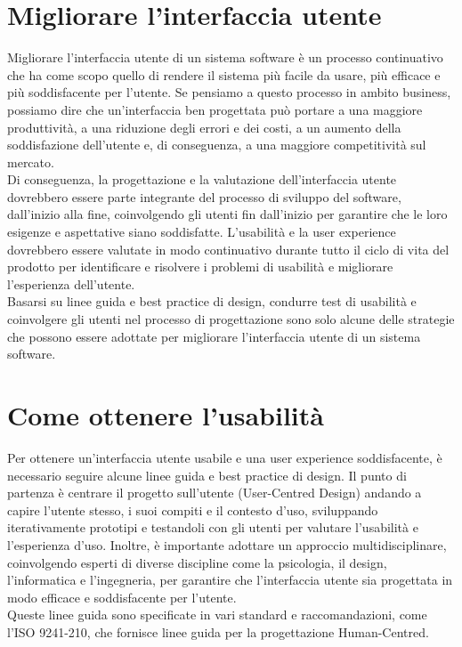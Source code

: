 \documentclass{report}
\begin{document}
	\section{Migliorare l'interfaccia utente}
	Migliorare l'interfaccia utente di un sistema software è un processo continuativo che ha come scopo quello di rendere il sistema più facile da usare, più efficace e più soddisfacente per l'utente. Se pensiamo a questo processo in ambito business, possiamo dire che un'interfaccia ben progettata può portare a una maggiore produttività, a una riduzione degli errori e dei costi, a un aumento della soddisfazione dell'utente e, di conseguenza, a una maggiore competitività sul mercato.
	\vspace{\baselineskip} \\
	Di conseguenza, la progettazione e la valutazione dell'interfaccia utente dovrebbero essere parte integrante del processo di sviluppo del software, dall'inizio alla fine, coinvolgendo gli utenti fin dall'inizio per garantire che le loro esigenze e aspettative siano soddisfatte. L'usabilità e la user experience dovrebbero essere valutate in modo continuativo durante tutto il ciclo di vita del prodotto per identificare e risolvere i problemi di usabilità e migliorare l'esperienza dell'utente.
	\vspace{\baselineskip} \\
	Basarsi su linee guida e best practice di design, condurre test di usabilità e coinvolgere gli utenti nel processo di progettazione sono solo alcune delle strategie che possono essere adottate per migliorare l'interfaccia utente di un sistema software. 

	\section{Come ottenere l'usabilità}
	Per ottenere un'interfaccia utente usabile e una user experience soddisfacente, è necessario seguire alcune linee guida e best practice di design. Il punto di partenza è centrare il progetto sull'utente (User-Centred Design) andando a capire l'utente stesso, i suoi compiti e il contesto d'uso, sviluppando iterativamente prototipi e testandoli con gli utenti per valutare l'usabilità e l'esperienza d'uso. Inoltre, è importante adottare un approccio multidisciplinare, coinvolgendo esperti di diverse discipline come la psicologia, il design, l'informatica e l'ingegneria, per garantire che l'interfaccia utente sia progettata in modo efficace e soddisfacente per l'utente.
	\vspace{\baselineskip} \\
	Queste linee guida sono specificate in vari standard e raccomandazioni, come l'ISO 9241-210, che fornisce linee guida per la progettazione Human-Centred.
\end{document}
